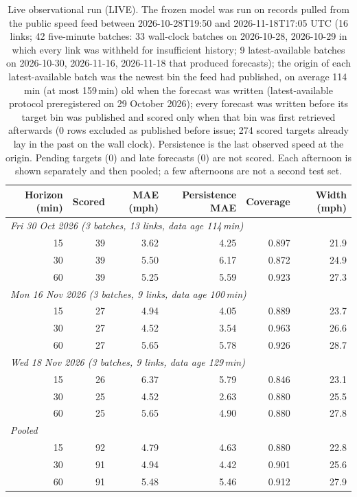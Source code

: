 \begin{table}[t]\centering\caption{Live observational run (LIVE). The frozen model was run on records pulled from the public speed feed between 2026-10-28T19:50 and 2026-11-18T17:05 UTC (16 links; 42 five-minute batches: 33 wall-clock batches on 2026-10-28, 2026-10-29 in which every link was withheld for insufficient history; 9 latest-available batches on 2026-10-30, 2026-11-16, 2026-11-18 that produced forecasts); the origin of each latest-available batch was the newest bin the feed had published, on average 114\,min (at most 159\,min) old when the forecast was written (latest-available protocol preregistered on 29 October 2026); every forecast was written before its target bin was published and scored only when that bin was first retrieved afterwards (0 rows excluded as published before issue; 274 scored targets already lay in the past on the wall clock). Persistence is the last observed speed at the origin. Pending targets (0) and late forecasts (0) are not scored. Each afternoon is shown separately and then pooled; a few afternoons are not a second test set.}\label{tab:live}\small
\begin{tabular}{rrrrrr}\toprule Horizon (min) & Scored & MAE (mph) & Persistence MAE & Coverage & Width (mph) \\ \midrule
\multicolumn{6}{l}{\emph{Fri 30 Oct 2026 (3 batches, 13 links, data age 114\,min)}} \\
15 & 39 & 3.62 & 4.25 & 0.897 & 21.9 \\
30 & 39 & 5.50 & 6.17 & 0.872 & 24.9 \\
60 & 39 & 5.25 & 5.59 & 0.923 & 27.3 \\
\multicolumn{6}{l}{\emph{Mon 16 Nov 2026 (3 batches, 9 links, data age 100\,min)}} \\
15 & 27 & 4.94 & 4.05 & 0.889 & 23.7 \\
30 & 27 & 4.52 & 3.54 & 0.963 & 26.6 \\
60 & 27 & 5.65 & 5.78 & 0.926 & 28.7 \\
\multicolumn{6}{l}{\emph{Wed 18 Nov 2026 (3 batches, 9 links, data age 129\,min)}} \\
15 & 26 & 6.37 & 5.79 & 0.846 & 23.1 \\
30 & 25 & 4.52 & 2.63 & 0.880 & 25.5 \\
60 & 25 & 5.65 & 4.90 & 0.880 & 27.8 \\
\midrule\multicolumn{6}{l}{\emph{Pooled}} \\
15 & 92 & 4.79 & 4.63 & 0.880 & 22.8 \\
30 & 91 & 4.94 & 4.42 & 0.901 & 25.6 \\
60 & 91 & 5.48 & 5.46 & 0.912 & 27.9 \\
\bottomrule\end{tabular}\end{table}
